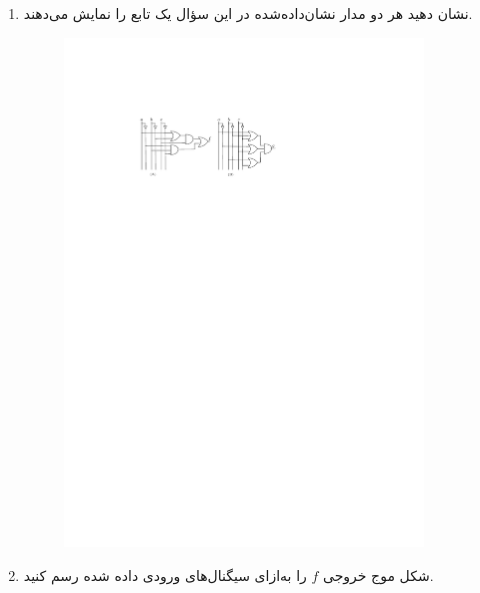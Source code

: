 \begin{enumerate}
	\item 
	نشان دهید هر دو مدار نشان‌داده‌شده در این سؤال یک تابع را نمایش می‌دهند. 
	
	\begin{figure}[h]
		\centering
		\includegraphics[width=0.9\textwidth]{fig/Q3.pdf}
		\label{fig:Q6_a}
	\end{figure}
	
	\item 
	شکل موج خروجی $f$ را به‌ازای سیگنال‌های ورودی داده شده رسم کنید.
	

\end{enumerate}
